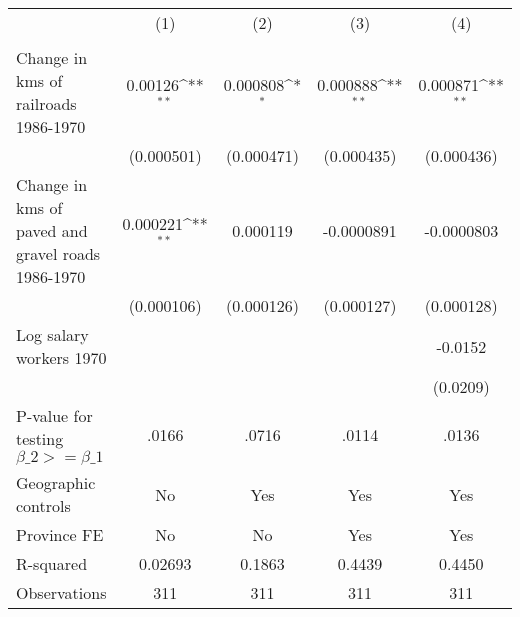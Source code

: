{
\def\sym#1{\ifmmode^{#1}\else\(^{#1}\)\fi}
\begin{tabular}{l*{4}{c}}
\hline\hline
                &\multicolumn{1}{c}{(1)}&\multicolumn{1}{c}{(2)}&\multicolumn{1}{c}{(3)}&\multicolumn{1}{c}{(4)}\\
                &\multicolumn{1}{c}{}&\multicolumn{1}{c}{}&\multicolumn{1}{c}{}&\multicolumn{1}{c}{}\\
\hline
Change in kms of railroads 1986-1970&  0.00126\sym{**} & 0.000808\sym{*}  & 0.000888\sym{**} & 0.000871\sym{**} \\
                &(0.000501)         &(0.000471)         &(0.000435)         &(0.000436)         \\
[1em]
Change in kms of paved and gravel roads 1986-1970& 0.000221\sym{**} & 0.000119         &-0.0000891         &-0.0000803         \\
                &(0.000106)         &(0.000126)         &(0.000127)         &(0.000128)         \\
[1em]
Log salary workers 1970&                  &                  &                  &  -0.0152         \\
                &                  &                  &                  & (0.0209)         \\
\hline
P-value for testing $\beta\_{2} >= \beta\_{1}$&    .0166         &    .0716         &    .0114         &    .0136         \\
Geographic controls&       No         &      Yes         &      Yes         &      Yes         \\
Province FE     &       No         &       No         &      Yes         &      Yes         \\
R-squared       &  0.02693         &   0.1863         &   0.4439         &   0.4450         \\
Observations    &      311         &      311         &      311         &      311         \\
\hline\hline
\end{tabular}
}
